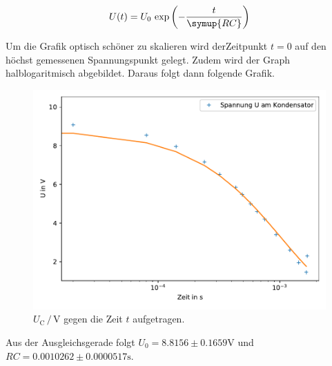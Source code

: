     \begin{equation}
    U(t) = U_0 \,  \exp\left(-\frac{t}{\symup{RC}}\right)
    \end{equation}

    \noindent
    Um die Grafik optisch schöner zu skalieren wird derZeitpunkt $t=0$ auf den höchst gemessenen Spannungspunkt gelegt. Zudem wird der Graph halblogaritmisch abgebildet. Daraus folgt dann
    folgende Grafik.

    \begin{figure}
        \centering
        \includegraphics[width=\textwidth]{Daten/a.pdf}
        \caption{$U_\text{C} \, / \, \si{\volt}$ gegen die Zeit $t$ aufgetragen.}
    \end{figure}

    \noindent
    Aus der Ausgleichsgerade folgt $U_0 = 8.8156 \pm 0.1659 \si{\volt}$ und $RC = 0.0010262 \pm 0.0000517 \si{\second} $.
\newpage
